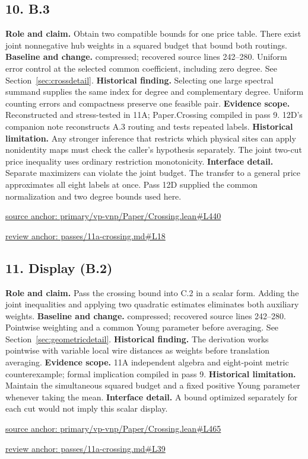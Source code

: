 \documentclass[11pt,letterpaper]{article}
\theoremstyle{definition}\newtheorem{definition}[theorem]{Definition}\newtheorem{example}[theorem]{Example}
\theoremstyle{remark}\newtheorem{remark}[theorem]{Remark}
\begin{document}
\subsection*{10. B.3}
\textbf{Role and claim.} Obtain two compatible bounds for one price table. There exist joint nonnegative hub weights in a squared budget that bound both routings.
\textbf{Baseline and change.} compressed; recovered source lines 242--280. Uniform error control at the selected common coefficient, including zero degree. See Section~\ref{sec:crossdetail}.
\textbf{Historical finding.} Selecting one large spectral summand supplies the same index for degree and complementary degree. Uniform counting errors and compactness preserve one feasible pair.
\textbf{Evidence scope.} Reconstructed and stress-tested in 11A; Paper.Crossing compiled in pass 9. 12D's companion note reconstructs A.3 routing and tests repeated labels.
\textbf{Historical limitation.} Any stronger inference that restricts which physical sites can apply nonidentity maps must check the caller's hypothesis separately. The joint two-cut price inequality uses ordinary restriction monotonicity.
\textbf{Interface detail.} Separate maximizers can violate the joint budget. The transfer to a general price approximates all eight labels at once. Pass 12D supplied the common normalization and two degree bounds used here.
\par\href{https://github.com/nousentllc/VP-VNP-Review/blob/8a7976933b6b2b4ffda1ad3a0dfb5fc6b6f023e8/primary/vp-vnp/Paper/Crossing.lean\#L440}{source anchor: primary/vp-vnp/Paper/Crossing.lean\#L440}
\par\href{https://github.com/nousentllc/VP-VNP-Review/blob/8a7976933b6b2b4ffda1ad3a0dfb5fc6b6f023e8/passes/11a-crossing.md\#L18}{review anchor: passes/11a-crossing.md\#L18}
\goodbreak
\subsection*{11. Display (B.2)}
\textbf{Role and claim.} Pass the crossing bound into C.2 in a scalar form. Adding the joint inequalities and applying two quadratic estimates eliminates both auxiliary weights.
\textbf{Baseline and change.} compressed; recovered source lines 242--280. Pointwise weighting and a common Young parameter before averaging. See Section~\ref{sec:geometricdetail}.
\textbf{Historical finding.} The derivation works pointwise with variable local wire distances as weights before translation averaging.
\textbf{Evidence scope.} 11A independent algebra and eight-point metric counterexample; formal implication compiled in pass 9.
\textbf{Historical limitation.} Maintain the simultaneous squared budget and a fixed positive Young parameter whenever taking the mean.
\textbf{Interface detail.} A bound optimized separately for each cut would not imply this scalar display.
\par\href{https://github.com/nousentllc/VP-VNP-Review/blob/8a7976933b6b2b4ffda1ad3a0dfb5fc6b6f023e8/primary/vp-vnp/Paper/Crossing.lean\#L465}{source anchor: primary/vp-vnp/Paper/Crossing.lean\#L465}
\par\href{https://github.com/nousentllc/VP-VNP-Review/blob/8a7976933b6b2b4ffda1ad3a0dfb5fc6b6f023e8/passes/11a-crossing.md\#L39}{review anchor: passes/11a-crossing.md\#L39}
\goodbreak
\end{document}

